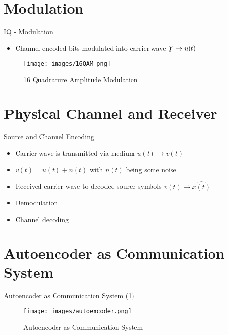 \documentclass[xcolor=table,mathserif,9pt]{beamer}    %
\newcommand{\ubar}[1]{\underaccent{\bar}{#1}}
\begin{document}
\section{Modulation}%
\begin{frame}{IQ - Modulation}

\begin{itemize}
	\item Channel encoded bits modulated into carrier wave $\ubar{Y} \to u(t)$
\end{itemize}

\begin{figure}[htpb]
	\centering
	\texttt{[image: images/16QAM.png]}
	\caption{16 Quadrature Amplitude Modulation}
	\label{fig:16QAM}
\end{figure}

\end{frame}

\section{Physical Channel and Receiver}
\begin{frame}{Source and Channel Encoding}

\vspace{1em}
\begin{itemize}
	\item Carrier wave is transmitted via medium $u(t) \to v(t)$
	\item $v(t) = u(t) + n(t)$ with $n(t)$ being some noise 
\end{itemize}

\vspace{2em}

\vspace{1em}
\begin{itemize}
	\item Received carrier wave to decoded source symbols $v(t) \to \hat{x(t)}$
	\item Demodulation 
	\item Channel decoding 
\end{itemize}

\end{frame}

\section{Autoencoder as Communication System}
\begin{frame}{Autoencoder as Communication System (1)}

\begin{figure}[htpb]
	\centering
	\texttt{[image: images/autoencoder.png]}
	\caption{Autoencoder as Communication System}
	\label{fig:autoencoder}
\end{figure}

\end{frame}
\end{document}
